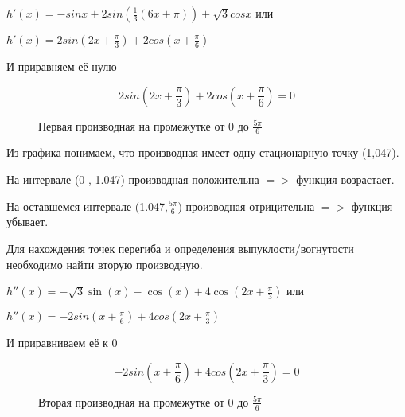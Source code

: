 \documentclass[russian,utf8,nocolumnxxxi,nocolumnxxxii]{eskdtext}
\begin{document}
\begin{enumerate}
        $h'(x)=-sinx+2sin(\frac{1}{3}(6x+\pi))+\sqrt{3}cosx$ или
        
         $h'(x)=2sin(2x+\frac{\pi}{3})+2cos(x+\frac{\pi}{6})$
         
         И приравняем её нулю
         
         $$2sin(2x+\frac{\pi}{3})+2cos(x+\frac{\pi}{6})=0$$
         
          \begin{figure}[h]
      \centering
      \caption{Первая производная на промежутке от 0 до $\frac{5\pi}{6}$}
    
   \end{figure}
  
  Из графика понимаем, что производная имеет одну стационарную точку (1,047).
  
  На интервале (0 , 1.047) производная положительна $=>$ функция возрастает.
  
  На оставшемся интервале (1.047,$\frac{5\pi}{6}$) производная отрицительна $=>$ функция убывает.
       
        Для нахождения точек перегиба и определения выпуклости/вогнутости необходимо найти вторую производную.
        
        $h''(x) = - \sqrt{3} \sin{\left (x \right )} - \cos{\left (x \right )} + 4 \cos{\left (2 x + \frac{\pi}{3} \right )}$ или
        
        $h''(x) = -2sin(x+\frac{\pi}{6})+4cos(2x+\frac{\pi}{3})$
        
        И приравниваем её к 0
        
        $$-2sin(x+\frac{\pi}{6})+4cos(2x+\frac{\pi}{3})=0$$
        
    \begin{figure}[h]
      \centering
      \caption{Вторая производная на промежутке от 0 до $\frac{5\pi}{6}$}
    
   \end{figure}
    

\end{enumerate}
\end{document}
